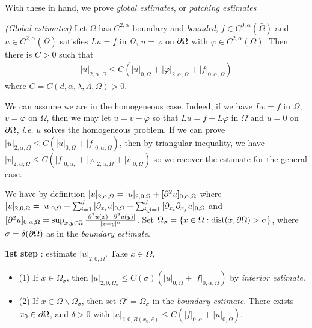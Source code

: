 \documentclass[12pt,a4paper]{article}
\newenvironment{proof}
{\begin{changemargin}{1cm}{0.5cm} 
	}%
	{\end{changemargin}
}
\renewenvironment{i}
{\begin{itemize} 
	}%
	{\end{itemize}
}
\newenvironment{p}
{\begin{proof} 
	}%
	{\end{proof}
}
\begin{document}
With these in hand, we prove \emph{global estimates}, or \emph{patching estimates}

\s

\thm \emph{(Global estimates)} Let $\Omega$ has $C^{2, \alpha}$ boundary and \emph{bounded}, $f\in C^{0, \alpha}(\bar{\Omega})$ and $u\in C^{2, \alpha}(\bar{\Omega})$ satisfies $Lu =f$ in $\Omega$, $u = \varphi$ on $\partial \Omega$ with $\varphi \in C^{2, \alpha}(\Omega)$. Then there is $C >0$ such that
\begin{align*}
|u|_{2, \alpha, \Omega} \leq C (|u|_{0, \Omega} + |\varphi|_{2, \alpha, \Omega} + |f|_{0, \alpha, \Omega})
\end{align*}
where $C = C(d, \alpha, \lambda, \Lambda, \Omega)>0$.
\begin{p}
\pf We can assume we are in the homogeneous case. Indeed, if we have $Lv = f$ in $\Omega$, $v=\varphi$ on $\Omega$, then we may let $u = v- \varphi$ so that $Lu =f- L\varphi$ in $\Omega$ and $u=0$ on $\partial \Omega$, \textit{i.e.} $u$ solves the homogeneous problem. If we can prove $|u|_{2, \alpha, \Omega} \leq C(|u|_{0, \Omega} + |f|_{0, \alpha, \Omega})$, then by triangular inequality, we have $|v|_{2, \alpha, \Omega} \leq \tilde{C}(|f|_{0, \alpha, }+ |\varphi|_{2, \alpha, \Omega} + |v|_{0, \Omega})$ so we recover the estimate for the general case.
\s

We have by definition $|u|_{2, \alpha, \Omega} = |u|_{2, 0,\Omega} + [\partial^2 u]_{0, \alpha,\Omega}$ where $|u|_{2, 0, \Omega} = |u|_{0, \Omega}+ \sum_{i=1}^d |\partial_{x_i} u|_{0, \Omega} + \sum_{i,j=1}^d |\partial_{x_i} \partial_{x_j} u|_{0, \Omega}$ and $[\partial^2 u]_{0, \alpha, \Omega} = \sup_{x,y\in \Omega} \frac{|\partial^2 u(x) - \partial^2 u(y)|}{|x-y|^{\alpha}}$. Set $\Omega_{\sigma} = \{x\in \Omega : \text{dist}(x, \partial \Omega) > \sigma \}$, where $\sigma = \delta (\partial \Omega)$ as in the \emph{boundary estimate}.

\s

\textbf{1st step} : estimate $|u|_{2, 0, \Omega}$. Take $x\in \Omega$,
\begin{i}
\item[(1)] If $x\in \Omega_{\sigma}$, then $|u|_{2,0, \Omega_{\sigma}}\leq C(\sigma)(|u|_{0, \Omega} + |f|_{0, \alpha, \Omega})$ by \emph{interior estimate}.
\item[(2)] If $x\in \Omega \backslash \Omega_{\sigma}$, then set $\Omega' = \Omega_{\sigma}$ in the \emph{boundary estimate}. There exists $x_0 \in \partial \Omega$, and $\delta>0$ with $|u|_{2, 0, B(x_0, \delta)} \leq C (|f|_{0, \alpha} + |u|_{0, \Omega})$.
\end{i}
\s


\end{p}
\end{document}
